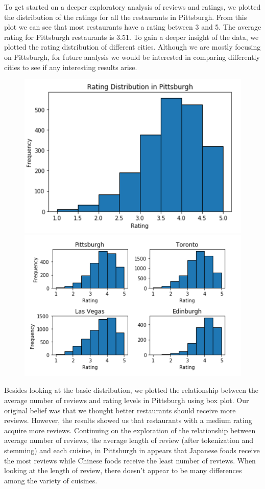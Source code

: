 \documentclass{neu_handout}
\begin{document}
To get started on a deeper exploratory analysis of reviews and ratings, we plotted the distribution of the ratings for all the restaurants in Pittsburgh. From this plot we can see that most restaurants have a rating between 3 and 5. The average rating for Pittsburgh restaurants is 3.51. To gain a deeper insight of the data, we plotted the rating distribution of different cities. Although we are mostly focusing on Pittsburgh, for future analysis we would be interested in comparing differently cities to see if any interesting results arise.

\begin{figure}[h]
\centering
{
\includegraphics[width=0.4\linewidth]{rating_distribution_in_Pittsburgh}
}
{
\includegraphics[width=0.4\linewidth]{rating_distribution_vs_countries}
}
\end{figure}

Besides looking at the basic distribution, we plotted the relationship between the average number of reviews and rating levels in Pittsburgh using box plot. Our original belief was that we thought better restaurants should receive more reviews. However, the results showed us that restaurants with a medium rating acquire more reviews. Continuing on the exploration of the relationship between average number of reviews, the average length of review (after tokenization and stemming) and each cuisine, in Pittsburgh in appears that Japanese foods receive the most reviews while Chinese foods receive the least number of reviews. When looking at the length of review, there doesn't appear to be many differences among the variety of cuisines. 
\end{document}
